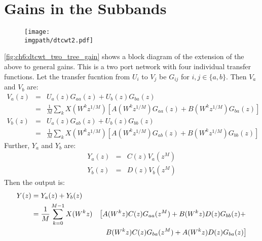 \section{Gains in the Subbands}
\begin{figure}[t]
  \centering
  \texttt{[image: \\imgpath/dtcwt2.pdf]}
  \label{fig:ch6:dtcwt_two_tree_gain}
\end{figure}

\autoref{fig:ch6:dtcwt_two_tree_gain} shows a block diagram of the extension of 
the above to general gains. This is a two port network with four individual
transfer functions. Let the transfer fucntion from $U_i$ to $V_j$
be $G_{ij}$ for $i, j \in \{a, b\}$. Then $V_a$ and $V_b$ are:
\begin{eqnarray}
  V_a(z) &=& U_a(z)G_{aa}(z) + U_b(z)G_{ba}(z) \\
         &=& \frac{1}{M} \sum_k X(W^{k} z^{1/M}) \left[A(W^k z^{1/M})G_{aa}(z) +
             B(W^k z^{1/M}) G_{ba}(z) \right] \\
  V_b(z) &=& U_a(z)G_{ab}(z) + U_b(z)G_{bb}(z) \\
         &=& \frac{1}{M} \sum_k X(W^{k} z^{1/M}) \left[A(W^k z^{1/M})G_{ab}(z) +
             B(W^k z^{1/M}) G_{bb}(z) \right] 
\end{eqnarray}
%
Further, $Y_a$ and $Y_b$ are:
\begin{eqnarray}
  Y_a(z) &=& C(z)V_a(z^M) \\
  Y_b(z) &=& D(z)V_b(z^M)
\end{eqnarray}
%
Then the output is:
\begin{alignat}{2}
    Y(z) &= Y_{a}(z) + Y_{b}(z) \\
         &= \frac{1}{M} \sum_{k=0}^{M-1} X(W^k z) & \left[  A(W^kz)C(z)G_{aa}(z^M) + B(W^kz)D(z)G_{bb}(z) + \right. \nonumber \\
         &                                        & \left. \hphantom{[}  B(W^kz)C(z)G_{ba}(z^M) + A(W^kz)D(z)G_{ba}(z) \right] 
    \label{eq:ch6:transfer}
\end{alignat}

